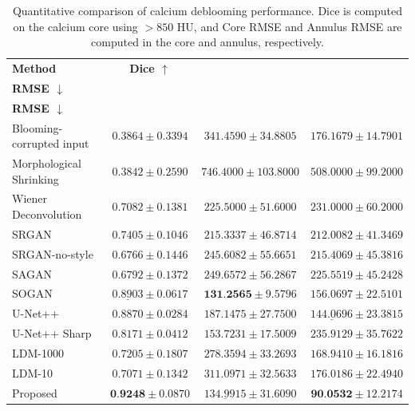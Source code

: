 \documentclass[singleLetter,times]{sagej}
\begin{document}
\begin{table}[t]
\centering
\caption{Quantitative comparison of calcium deblooming performance. Dice is computed on the calcium core using $>850$ HU, and Core RMSE and Annulus RMSE are computed in the core and annulus, respectively.}
\label{tab:deblooming_results}
\small
\setlength{\tabcolsep}{2pt}
\begin{tabular*}{\linewidth}{@{\extracolsep{\fill}}lccc@{}}
\hline
\textbf{Method} &
\textbf{Dice $\uparrow$} &
\begin{tabular}[c]{@{}c@{}}\textbf{Core}\\\textbf{RMSE $\downarrow$}\end{tabular} &
\begin{tabular}[c]{@{}c@{}}\textbf{Annulus}\\\textbf{RMSE $\downarrow$}\end{tabular} \\
\hline
Blooming-corrupted input & $0.3864 \pm 0.3394$ & $341.4590 \pm 34.8805$ & $176.1679 \pm 14.7901$ \\
Morphological Shrinking & $0.3842 \pm 0.2590$ & $746.4000 \pm 103.8000$ & $508.0000 \pm 99.2000$ \\
Wiener Deconvolution & $0.7082 \pm 0.1381$ & $225.5000 \pm 51.6000$ & $231.0000 \pm 60.2000$ \\
SRGAN & $0.7405 \pm 0.1046$ & $215.3337 \pm 46.8714$ & $212.0082 \pm 41.3469$ \\
SRGAN-no-style & $0.6766 \pm 0.1446$ & $245.6082 \pm 55.6651$ & $215.4069 \pm 45.3816$ \\
SAGAN & $0.6792 \pm 0.1372$ & $249.6572 \pm 56.2867$ & $225.5519 \pm 45.2428$ \\
SOGAN & $\underline{0.8903} \pm 0.0617$ & $\textbf{131.2565} \pm 9.5796$ & $156.0697 \pm 22.5101$ \\
U-Net++ & $0.8870 \pm 0.0284$ & $187.1475 \pm 27.7500$ & $\underline{144.0696} \pm 23.3815$ \\
U-Net++ Sharp & $0.8171 \pm 0.0412$ & $153.7231 \pm 17.5009$ & $235.9129 \pm 35.7622$ \\
LDM-1000 & $0.7205 \pm 0.1807$ & $278.3594 \pm 33.2693$ & $168.9410 \pm 16.1816$ \\
LDM-10 & $0.7071 \pm 0.1342$ & $311.0971 \pm 32.5633$ & $176.0186 \pm 22.4940$ \\
Proposed & $\textbf{0.9248} \pm 0.0870$ & $\underline{134.9915} \pm 31.6090$ & $\textbf{90.0532} \pm 12.2174$ \\
\hline
\end{tabular*}
\end{table}
\end{document}
